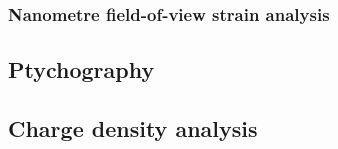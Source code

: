 \subsubsection{Nanometre field-of-view strain analysis}

\subsection{Ptychography}

\subsection{Charge density analysis}

